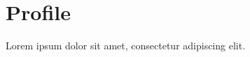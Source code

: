 \documentclass{vitae}
\begin{document}
\section{Profile}
Lorem ipsum dolor sit amet, consectetur adipiscing elit.
\end{document}
